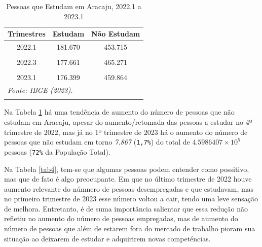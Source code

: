 \documentclass[
  12pt,
  a4paper,
]{article}
\begin{document}
\begin{longtable}[t]{ccc}
\caption{\label{tab:tab3}\label{tab3}Pessoas que Estudam em Aracaju, 2022.1 a 2023.1}\\
\toprule
Trimestres & Estudam & Não Estudam\\
\midrule
2022.1 & 181.670 & 453.715\\
\cellcolor[HTML]{DCDCDC}{2022.2} & \cellcolor[HTML]{DCDCDC}{180.855} & \cellcolor[HTML]{DCDCDC}{460.077}\\
2022.3 & 177.661 & 465.271\\
\cellcolor[HTML]{DCDCDC}{2022.4} & \cellcolor[HTML]{DCDCDC}{187.619} & \cellcolor[HTML]{DCDCDC}{451.997}\\
2023.1 & 176.399 & 459.864\\
\bottomrule
\multicolumn{3}{l}{\rule{0pt}{1em}\textit{Fonte: IBGE (2023).}}\\
\multicolumn{3}{l}{\rule{0pt}{1em}}\\
\end{longtable}
\endgroup{}

Na Tabela \ref{tab3} há uma tendência de aumento do número de pessoas
que não estudam em Aracaju, apesar do aumento/retomada das pessoas a
estudar no 4º trimestre de 2022, mas já no 1º trimestre de 2023 há o
aumento do número de pessoas que não estudam em torno \emph{7.867}
(\texttt{1,7\%}) do total de \ensuremath{4.5986407\times 10^{5}} pessoas
(\texttt{72\%} da População Total).

Na Tabela \ref{tab4}, tem-se que algumas pessoas podem entender como
possitivo, mas que de fato é algo preocupante. Em que no último
trimestre de 2022 houve aumento relevante do númnero de pessoas
desempregadas e que estudavam, mas no primeiro trimestre de 2023 esse
número voltou a cair, tendo uma leve sensação de melhora. Entretanto, é
de suma importância salientar que essa redução não refletiu no aumento
do número de pessoas empregadas, mas de aumento do número de pessoas que
além de estarem fora do mercado de trabalho pioram sua situação ao
deixarem de estudar e adquirirem novas competéncias.

\begingroup\fontsize{9}{11}\selectfont
\end{document}

